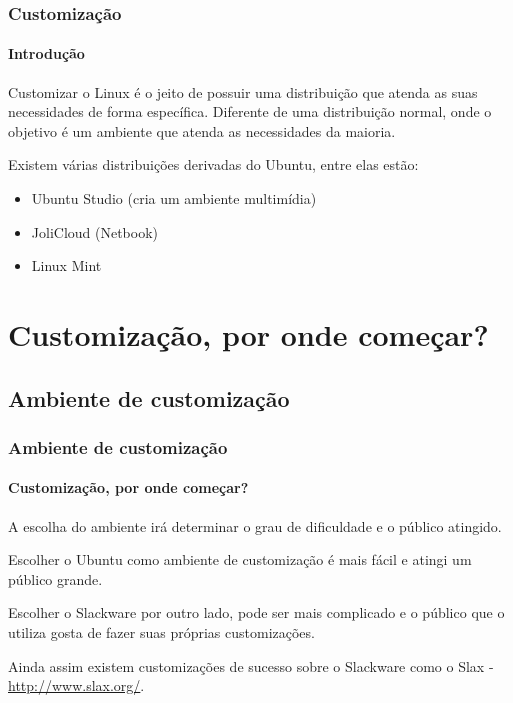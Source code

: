 \begin{frame}\frametitle{Customização}\framesubtitle{Introdução}

Customizar o Linux é o jeito de possuir uma distribuição que atenda as suas necessidades de forma específica.
Diferente de uma distribuição normal, onde o objetivo é um ambiente que atenda as necessidades da maioria.

\medskip

Existem várias distribuições derivadas do Ubuntu, entre elas estão:
\begin{itemize}
	\item Ubuntu Studio (cria um ambiente multimídia)
	\item JoliCloud (Netbook)
	\item Linux Mint
\end{itemize}

\end{frame}

\section{Customização, por onde começar?}

\begin{frame}


\end{frame}

\subsection{Ambiente de customização}

\begin{frame}


\end{frame}

\begin{frame}\frametitle{Ambiente de customização}\framesubtitle{Customização, por onde começar?}

A escolha do ambiente irá determinar o grau de dificuldade e o público atingido.

\medskip

Escolher o Ubuntu como ambiente de customização é mais fácil e atingi um público grande.

\medskip

Escolher o Slackware por outro lado, pode ser mais complicado e o público que o utiliza
gosta de fazer suas próprias customizações.

\medskip

Ainda assim existem customizações de sucesso sobre o Slackware como o Slax - \url{http://www.slax.org/}.

\end{frame}

